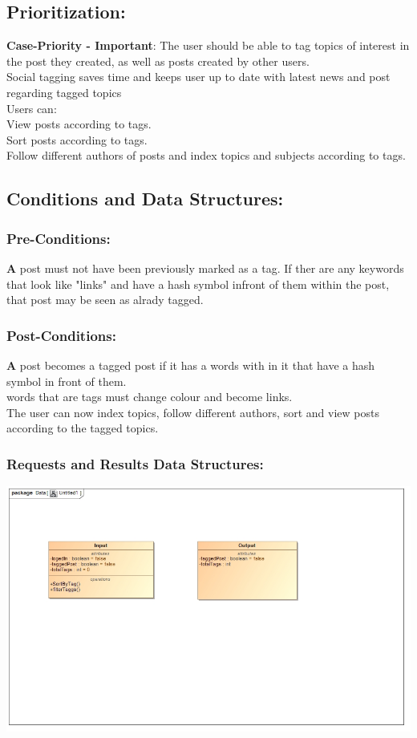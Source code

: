 \documentclass[a4paper,11pt]{article}
\begin{document}
\subsection{Prioritization:} 
\textbf{Case-Priority - Important}: The user should be able to tag topics of   interest in the post they created, as well
as posts created by other users.
\\Social tagging saves time and keeps user up to date with latest news and post regarding tagged topics
\\Users can: 
\\View posts according to tags.
\\Sort posts according to tags.
\\Follow different authors of posts and index topics and subjects according to tags.
\subsection{Conditions and Data Structures:}
\subsubsection*{Pre-Conditions:}
\textbf A post must not have been previously marked as a tag. If ther are any keywords that look like "links" and have a hash symbol infront of them within the post, that post may be seen as alrady tagged.
\subsubsection*{Post-Conditions:}
\textbf A post becomes a tagged post if it has a words with in it that have a hash symbol in front of them.
\\ words that are tags must change colour and become links.
\\The user can now index topics, follow different authors, sort and view posts according to the tagged topics.

\subsubsection*{Requests and Results Data Structures:}

\begin{center}
\includegraphics[width=0.9\linewidth]{Tag_Input_Output_ClassDiagram}
\end{center}
\end{document}
